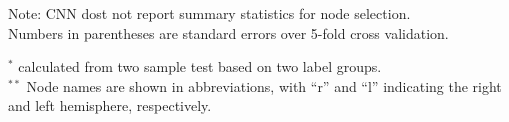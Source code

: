 \documentclass[11pt]{article}
\begin{document}
\normalsize

\normalsize
\begin{table}
\vspace{.5cm}
{\small Note: CNN dost not report summary statistics for node selection.\\
Numbers in parentheses are standard errors over 5-fold cross validation. }\\
\end{table}

\vspace{2cm}
\begin{table}
\vspace{.4cm}
{\small $^*$ calculated from two sample test based on two label groups. \\
 $^{**}$ Node names are shown in abbreviations, with ``r'' and ``l'' indicating the right and left hemisphere, respectively.  }
\end{table}



%

\end{document}

